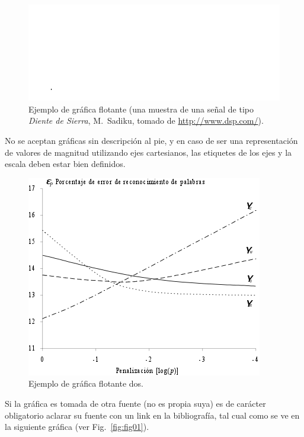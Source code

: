 \documentclass[
10pt,			%
letterpaper,	%
oneside,		%
headinclude, footinclude, %
BCOR5mm, 		%
]{scrartcl}
\begin{document}
\begin{figure}[tb]
	\centering 
	\includegraphics[width=0.6\columnwidth]{fig01} %
	\caption[Ejemplo de gráfica flotante]{Ejemplo de gráfica flotante (una muestra de una señal de tipo \emph{Diente de Sierra}, M.~Sadiku, tomado de \url{http://www.dsp.com/}).} %
	\label{fig:fig01} 
\end{figure}

No se aceptan gráficas sin descripción al pie, y en caso de ser una representación de valores de magnitud utilizando ejes cartesianos, las etiquetes de los ejes y la escala deben estar bien definidos.

\begin{figure}[tbhp]
	\centerline{\includegraphics[scale=0.7]{fig02}} %
	\caption[Ejemplo de gráfica flotante dos]{Ejemplo de gráfica flotante dos.} %
	\label{fig:fig02}
\end{figure}

Si la gráfica es tomada de otra fuente (no es propia suya) es de carácter obligatorio aclarar su fuente con un link en la bibliografía, tal cual como se ve en la siguiente gráfica (ver Fig.~\vref{fig:fig01}).
\end{document}
